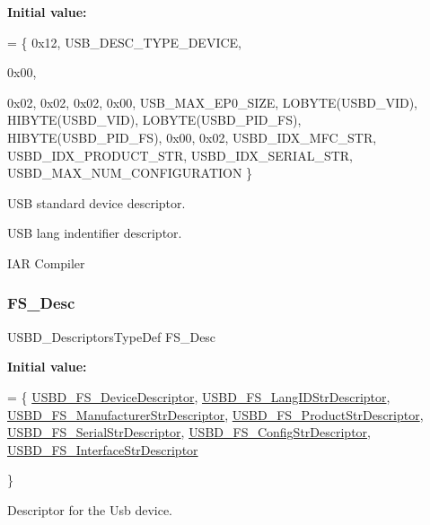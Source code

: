 {\bfseries Initial value\+:}
\begin{DoxyCode}
=
    \{
        0x12,                 
        USB\_DESC\_TYPE\_DEVICE, 





        0x00, 

        0x02,
        0x02,                
        0x02,                
        0x00,                
        USB\_MAX\_EP0\_SIZE,    
        LOBYTE(USBD\_VID),    
        HIBYTE(USBD\_VID),    
        LOBYTE(USBD\_PID\_FS), 
        HIBYTE(USBD\_PID\_FS), 
        0x00,                
        0x02,
        USBD\_IDX\_MFC\_STR,          
        USBD\_IDX\_PRODUCT\_STR,      
        USBD\_IDX\_SERIAL\_STR,       
        USBD\_MAX\_NUM\_CONFIGURATION 
\}
\end{DoxyCode}
U\+SB standard device descriptor.

U\+SB lang indentifier descriptor.

I\+AR Compiler \mbox{\label{group__USBD__DESC__Private__Variables_gae36d67393118d9d8531a8d633e23a797}} 
\subsubsection{\texorpdfstring{F\+S\+\_\+\+Desc}{FS\_Desc}}
{\footnotesize\ttfamily U\+S\+B\+D\+\_\+\+Descriptors\+Type\+Def F\+S\+\_\+\+Desc}

{\bfseries Initial value\+:}
\begin{DoxyCode}
=
    \{
        \hyperlink{group__USBD__DESC__Private__Functions_ga14798be38c08a37163e53167032485ff}{USBD\_FS\_DeviceDescriptor}, 
      \hyperlink{group__USBD__DESC__Private__Functions_gac02628ceb6a6a071e192dcb85063c0cc}{USBD\_FS\_LangIDStrDescriptor}, 
      \hyperlink{group__USBD__DESC__Private__Functions_ga6427a671827813efe1a46c3dfcb05683}{USBD\_FS\_ManufacturerStrDescriptor}, 
      \hyperlink{group__USBD__DESC__Private__Functions_ga0ec558c0303daabb851d584109a56514}{USBD\_FS\_ProductStrDescriptor}, 
      \hyperlink{group__USBD__DESC__Private__Functions_gaad2a1d1451821845eda602a82b1cd213}{USBD\_FS\_SerialStrDescriptor}, 
      \hyperlink{group__USBD__DESC__Private__Functions_ga40ed2a0fb60c50a285983a09ba6921d6}{USBD\_FS\_ConfigStrDescriptor}, 
      \hyperlink{group__USBD__DESC__Private__Functions_gab248f43276f92d982ab5853111e4fb10}{USBD\_FS\_InterfaceStrDescriptor}



 
\}
\end{DoxyCode}
Descriptor for the Usb device. 